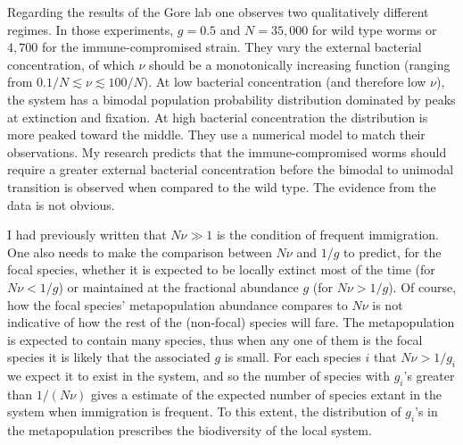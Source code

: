 Regarding the results of the Gore lab \cite{Vega2017} one observes two qualitatively different regimes. 
In those experiments, $g=0.5$ and $N=35,000$ for wild type worms or $4,700$ for the immune-compromised strain. 
They vary the external bacterial concentration, of which $\nu$ should be a monotonically increasing function (ranging from $0.1/N \lesssim \nu \lesssim 100/N$). 
At low bacterial concentration (and therefore low $\nu$), the system has a bimodal population probability distribution dominated by peaks at extinction and fixation. 
At high bacterial concentration the distribution is more peaked toward the middle. %
They use a numerical model to match their observations. 
My research predicts that the immune-compromised worms should require a greater external bacterial concentration before the bimodal to unimodal transition is observed when compared to the wild type. 
The evidence from the data is not obvious. 

I had previously written that $N\nu \gg 1$ is the condition of frequent immigration. 
One also needs to make the comparison between $N\nu$ and $1/g$ to predict, for the focal species, whether it is expected to be locally extinct most of the time (for $N\nu<1/g$) or maintained at the fractional abundance $g$ (for $N\nu>1/g$). 
Of course, how the focal species' metapopulation abundance compares to $N\nu$ is not indicative of how the rest of the (non-focal) species will fare. %
The metapopulation is expected to contain many species, thus when any one of them is the focal species it is likely that the associated $g$ is small. 
For each species $i$ that $N\nu>1/g_i$ we expect it to exist in the system, and so the number of species with $g_i$'s greater than $1/(N\nu)$ gives a estimate of the expected number of species extant in the system when immigration is frequent. 
To this extent, the distribution of $g_i$'s in the metapopulation prescribes the biodiversity of the local system. 



